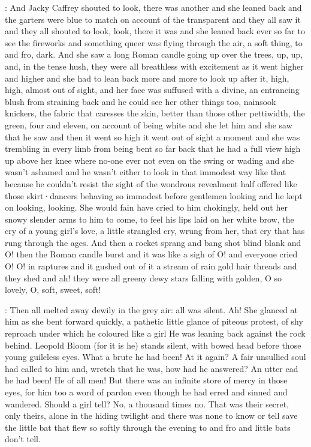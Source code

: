 :
And Jacky Caffrey shouted
to look,
there was another
and she leaned back
and the garters were blue to match
on account of the transparent
and they all saw it
and they all shouted to look,
look,
there it was
and she leaned back ever so far
to see the fireworks
and something queer was flying through the air,
a soft thing,
to and fro,
dark.
And she saw a long Roman candle
going up over the trees,
up,
up,
and,
in the tense hush,
they were all breathless with excitement
as it went higher and higher
and she had to lean back more and more
to look up after it,
high,
high,
almost out of sight,
and her face was suffused
with a divine,
an entrancing blush from straining back
and he could see her other things too,
nainsook knickers,
the fabric that caresses the skin,
better than those other pettiwidth,
the green,
four and eleven,
on account of being white
and she let him
and she saw that he saw
and then it went so high
it went out of sight a moment
and she was trembling in every limb
from being bent so far back
that he had a full view
high up above her knee
where no-one ever
not even on the swing or wading
and she wasn't ashamed
and he wasn't either
to look in that immodest way like that
because he couldn't resist
the sight of the wondrous revealment
half offered like those skirt·dancers
behaving so immodest before gentlemen looking
and he kept on looking,
looking.
She would fain have cried to him
chokingly,
held out her snowy slender arms to him
to come,
to feel his lips
laid on her white brow,
the cry of a young girl's love,
a little strangled cry,
wrung from her,
that cry
that has rung through the ages.
And then a rocket
sprang and bang
shot blind blank
and O!
then the Roman candle burst
and it was like a sigh of O!
and everyone cried O!
O!
in raptures
and it gushed out of it
a stream of rain gold hair threads
and they shed
and ah!
they were
all greeny dewy stars falling with golden,
O so lovely,
O,
soft,
sweet,
soft!

:
Then all melted away
dewily in the grey air:
all was silent.
Ah!
She glanced at him
as she bent forward quickly,
a pathetic little glance of piteous protest,
of shy reproach
under which he coloured like a girl
He was leaning back against the rock behind.
Leopold Bloom
(for it is he)
stands silent,
with bowed head
before those young guileless eyes.
What a brute he had been!
At it again?
A fair unsullied soul had called to him
and,
wretch that he was,
how had he answered?
An utter cad
he had been!
He of all men!
But there was an infinite store of mercy
in those eyes,
for him too a word of pardon
even though he had
erred
and sinned
and wandered.
Should a girl tell?
No,
a thousand times no.
That was their secret,
only theirs,
alone in the hiding twilight
and there was none to know or tell
save the little bat
that flew so softly through the evening
to and fro
and little bats don't tell.

